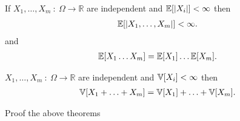 \newpage
\begin{theorem}
  If $X_{1},\ldots ,X_m \ : \ \Omega  \to \mathbb{R} $ are independent and $\mathbb{E}[\lvert X_i\rvert] < \infty$ then 
  \begin{align*}
    \mathbb{E}[\lvert X_{1},\ldots ,X_m\rvert]<\infty
  .\end{align*}
  and 
  \begin{align*}
    \mathbb{E}[X_{1}\ldots X_m] = \mathbb{E}[X_{1}]\ldots \mathbb{E}[X_m]
  .\end{align*}
\end{theorem}
\begin{theorem}
  $X_{1},\ldots ,X_m \ : \ \Omega  \to \mathbb{R} $ are independent and $\mathbb{V}[X_i] <\infty$ then 
  \begin{align*}
    \mathbb{V}[X_{1} + \ldots  + X_m] = \mathbb{V}[X_{1}] + \ldots  + \mathbb{V}[X_m]
  .\end{align*}
\end{theorem}
\begin{exercise}
 Proof the above theorems
\end{exercise}
